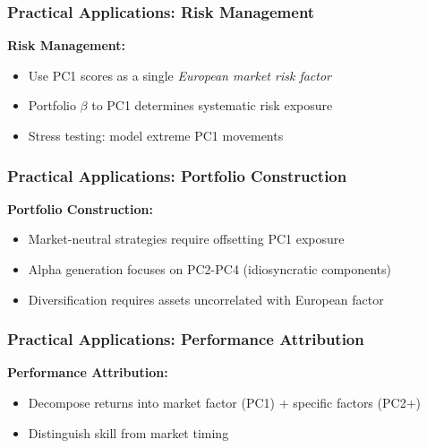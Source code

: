 \documentclass[aspectratio=169]{beamer}
\begin{document}
\begin{frame}
    \frametitle{Practical Applications: Risk Management}
    \textbf{Risk Management:}
    \begin{itemize}
        \item Use PC1 scores as a single \textit{European market risk factor} \pause
        \item Portfolio $\beta$ to PC1 determines systematic risk exposure \pause
        \item Stress testing: model extreme PC1 movements \pause
    \end{itemize}
\end{frame}

\begin{frame}
    \frametitle{Practical Applications: Portfolio Construction}
    \textbf{Portfolio Construction:}
    \begin{itemize}
        \item Market-neutral strategies require offsetting PC1 exposure \pause
        \item Alpha generation focuses on PC2-PC4 (idiosyncratic components) \pause
        \item Diversification requires assets uncorrelated with European factor \pause
    \end{itemize}
\end{frame}

\begin{frame}
    \frametitle{Practical Applications: Performance Attribution}
    \textbf{Performance Attribution:}
    \begin{itemize}
        \item Decompose returns into market factor (PC1) + specific factors (PC2+) \pause
        \item Distinguish skill from market timing \pause
    \end{itemize}
\end{frame}
\end{document}
